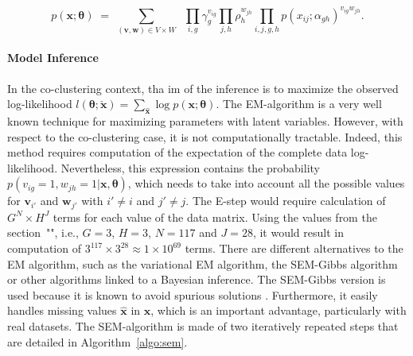 \begin{equation}
\label{eq:coclust}
  p\left(\boldsymbol{x};\boldsymbol{\theta}\right) \;=\;
  \underset{\left(\boldsymbol{v},\boldsymbol{w}\right) \in V\times W}{\sum} \;\;
    \underset{i,g}{\prod}\gamma_g^{v_{ig}}
    \underset{j,h}{\prod}\rho_h^{w_{jh}} 
    \underset{i,j,g,h}{\prod}p\left(x_{ij};\alpha_{gh}\right)^{v_{ig}w_{jh}}.
\end{equation}


\paragraph{Model Inference}
In the co-clustering context, tha im of the inference is to maximize the observed log-likelihood $l\left(\boldsymbol{\theta};\check{\boldsymbol{x}}\right) = \underset{\hat{\boldsymbol{x}}}{\sum}\log p\left(\boldsymbol{x};\boldsymbol{\theta}\right)$. The EM-algorithm \citep{Dempster77} is a very well known technique for maximizing parameters with latent variables. However, with respect to the co-clustering case, it is not computationally tractable. Indeed, this method requires computation of the expectation of the complete data log-likelihood. Nevertheless, this expression contains the probability $p\left(v_{ig}=1,w_{jh}=1|\boldsymbol{x},\boldsymbol{\theta}\right)$, which needs to take into account all the possible values for $\boldsymbol{v}_{i'}$ and $\boldsymbol{w}_{j'}$ with $i'\neq i$ and $j'\neq j$. The E-step would require calculation of $G^N \times H^J$ terms for each value of the data matrix. Using the values from the section~"", i.e., $G=3$, $H=3$, $N=117$ and $J=28$, it would result in computation of $3^{117} \times 3^{28} \approx 1\times 10^{69}$ terms. There are different alternatives to the EM algorithm, such as the variational EM algorithm, the SEM-Gibbs algorithm or other algorithms linked to a Bayesian inference. The SEM-Gibbs version is used because it is known to avoid spurious solutions \citep{keribin10}. Furthermore, it easily handles missing values $\hat{\boldsymbol{x}}$ in $\boldsymbol{x}$, which is an important advantage, particularly with real datasets. The SEM-algorithm is made of two iteratively repeated steps that are detailed in Algorithm~\ref{algo:sem}.



